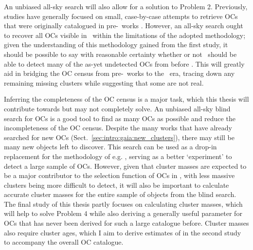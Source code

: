 An unbiased all-sky search will also allow for a solution to Problem 2. Previously, studies have generally focused on small, case-by-case attempts to retrieve OCs that were originally catalogued in pre-\gaia\ works \citep[e.g.][]{cantat-gaudin_clusters_2020}. However, an all-sky search ought to recover all OCs visible in \gaia\ within the limitations of the adopted methodology; given the understanding of this methodology gained from the first study, it should be possible to say with reasonable certainty whether or not \gaia\ should be able to detect many of the as-yet undetected OCs from before \gaia. This will greatly aid in bridging the OC census from pre-\gaia\ works to the \gaia\ era, tracing down any remaining missing clusters while suggesting that some are not real.

Inferring the completeness of the OC census is a major task, which this thesis will contribute towards but may not completely solve. An unbiased all-sky blind search for OCs is a good tool to find as many OCs as possible and reduce the incompleteness of the OC census. Despite the many works that have already searched for new OCs (Sect.~\ref{sec:intro:gaia:new_clusters}), there may still be many new objects left to discover. This search can be used as a drop-in replacement for the methodology of e.g. \cite{anders_milky_2020}, serving as a better `experiment' to detect a large sample of OCs. However, given that cluster masses are expected to be a major contributor to the selection function of OCs in \gaia, with less massive clusters being more difficult to detect, it will also be important to calculate accurate cluster masses for the entire sample of objects from the blind search. The final study of this thesis partly focuses on calculating cluster masses, which will help to solve Problem 4 while also deriving a generally useful parameter for OCs that has never been derived for such a large catalogue before. Cluster masses also require cluster ages, which I aim to derive estimates of in the second study to accompany the overall OC catalogue.

